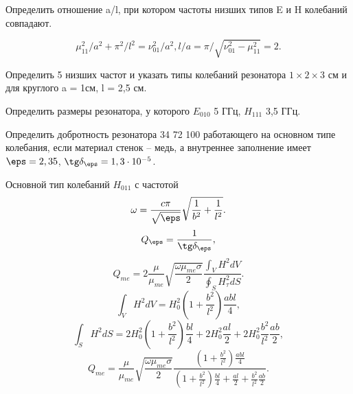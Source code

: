 Определить отношение a/l, при котором частоты низших типов E и H колебаний совпадают.

\[
	\mu_{11}^2/a^2 + \pi^2/l^2 = \nu_{01}^2/a^2, l/a = \pi/\sqrt{\nu_{01}^2 - \mu_{11}^2} = 2.
\]

Определить 5 низших частот и указать типы колебаний резонатора \(1\times2\times3\) см и для круглого a = 1см, l = 2,5 см.

Определить размеры резонатора, у которого \(E_{010}\) 5 ГГц, \(H_{111}\) 3,5 ГГц.

Определить добротность резонатора 34 72 100 работающего на основном типе колебания, если материал стенок -- медь, а внутреннее заполнение имеет \(\eps = 2,35\), \(\tg\delta_\eps = 1,3\cdot10^{-5}\).

Основной тип колебаний \( H_{011} \) с частотой
\[
	\omega = \frac{c\pi}{\sqrt{\eps}}\sqrt{\frac{1}{b^2} + \frac{1}{l^2}}.
\]
\[
	Q_\eps = \frac{1}{\tg\delta_\eps},
\]
\[
	Q_{me} = 2\frac{\mu}{\mu_{me}}\sqrt{\frac{\omega\mu_{me}\sigma}{2}}
	\frac{\int_V H^2 dV}{\oint_S H_\tau^2 dS}.
\]
\[
	\int_V H^2 dV = H_0^2\left( 1 + \frac{b^2}{l^2} \right)\frac{abl}{4},
\]
\[
	\int_S H^2 dS = 2H_0^2\left( 1 + \frac{b^2}{l^2} \right)\frac{bl}{4} +
	2H_0^2\frac{al}{2} + 2H_0^2\frac{b^2}{l^2}\frac{ab}{2},
\]
\[
	Q_{me} = \frac{\mu}{\mu_{me}}\sqrt{\frac{\omega\mu_{me}\sigma}{2}}
	\frac{\left( 1 + \frac{b^2}{l^2} \right)\frac{abl}{4}}{\left( 1 + \frac{b^2}{l^2} \right)\frac{bl}{4} + \frac{al}{2} + \frac{b^2}{l^2}\frac{ab}{2}}.
\]